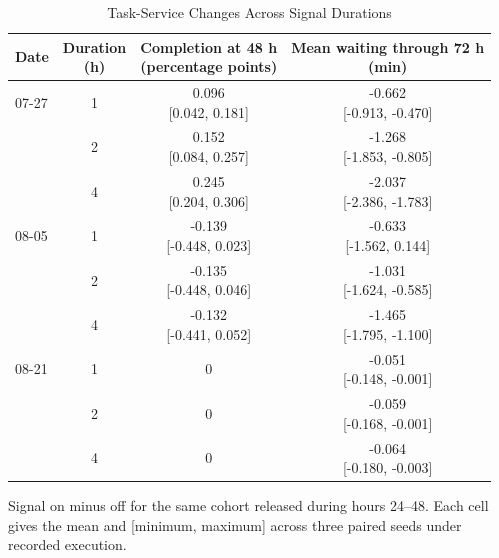 \begin{table}[H]
\color{black}
\caption{Task-Service Changes Across Signal Durations}
\label{tab:app-duration-service}
\centering\footnotesize
\setlength{\tabcolsep}{2pt}
\renewcommand{\arraystretch}{1.12}
\begin{tabular*}{\columnwidth}{@{\extracolsep{\fill}}lccc@{}}
\toprule
Date & \shortstack{Duration\\(h)} & \shortstack{Completion at 48 h\\(percentage points)} & \shortstack{Mean waiting through 72 h\\(min)}\\
\midrule
07-27 & 1 & \shortstack{0.096\\{}[0.042, 0.181]} & \shortstack{-0.662\\{}[-0.913, -0.470]}\\
 & 2 & \shortstack{0.152\\{}[0.084, 0.257]} & \shortstack{-1.268\\{}[-1.853, -0.805]}\\
 & 4 & \shortstack{0.245\\{}[0.204, 0.306]} & \shortstack{-2.037\\{}[-2.386, -1.783]}\\
\midrule
08-05 & 1 & \shortstack{-0.139\\{}[-0.448, 0.023]} & \shortstack{-0.633\\{}[-1.562, 0.144]}\\
 & 2 & \shortstack{-0.135\\{}[-0.448, 0.046]} & \shortstack{-1.031\\{}[-1.624, -0.585]}\\
 & 4 & \shortstack{-0.132\\{}[-0.441, 0.052]} & \shortstack{-1.465\\{}[-1.795, -1.100]}\\
\midrule
08-21 & 1 & 0 & \shortstack{-0.051\\{}[-0.148, -0.001]}\\
 & 2 & 0 & \shortstack{-0.059\\{}[-0.168, -0.001]}\\
 & 4 & 0 & \shortstack{-0.064\\{}[-0.180, -0.003]}\\
\bottomrule
\end{tabular*}
\vspace{3pt}
\parbox{\columnwidth}{Signal on minus off for the same cohort released during hours 24--48. Each cell gives the mean and [minimum, maximum] across three paired seeds under recorded execution.}
\end{table}
